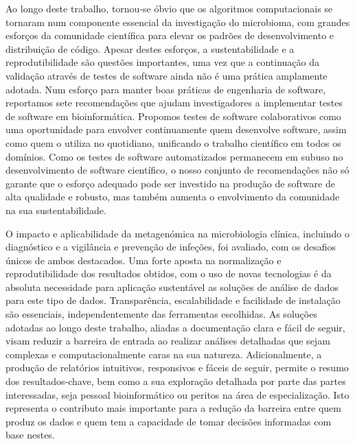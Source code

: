 Ao longo deste trabalho, tornou-se óbvio que os algoritmos computacionais se tornaram num componente essencial da investigação do microbioma, com grandes esforços da comunidade científica para elevar os padrões de desenvolvimento e distribuição de código. Apesar destes esforços, a sustentabilidade e a reprodutibilidade são questões importantes, uma vez que a continuação da validação através de testes de software ainda não é uma prática amplamente adotada. Num esforço para manter boas práticas de engenharia de software, reportamos sete recomendações que ajudam investigadores a implementar testes de software em bioinformática. Propomos testes de software colaborativos como uma oportunidade para envolver continuamente quem desenvolve software, assim como quem o utiliza no quotidiano, unificando o trabalho científico em todos os domínios. Como os testes de software automatizados permanecem em subuso no desenvolvimento de software científico, o nosso conjunto de recomendações não só garante que o esforço adequado pode ser investido na produção de software de alta qualidade e robusto, mas também aumenta o envolvimento da comunidade na sua sustentabilidade. 

O impacto e aplicabilidade da metagenómica na microbiologia clínica, incluindo o diagnóstico e a vigilância e prevenção de infeções, foi avaliado, com os desafios únicos de ambos destacados. Uma forte aposta na normalização e reprodutibilidade dos resultados obtidos, com o uso de novas tecnologias é da absoluta necessidade para aplicação sustentável as soluções de análise de dados para este tipo de dados. Transparência, escalabilidade e facilidade de instalação são essenciais, independentemente das ferramentas escolhidas. As soluções adotadas ao longo deste trabalho, aliadas a documentação clara e fácil de seguir, visam reduzir a barreira de entrada ao realizar análises detalhadas que sejam complexas e computacionalmente caras na sua natureza. Adicionalmente, a produção de relatórios intuitivos, responsivos e fáceis de seguir, permite o resumo dos resultados-chave, bem como a sua exploração detalhada por parte das partes interessadas, seja pessoal bioinformático ou peritos na área de especialização. Isto representa o contributo mais importante para a redução da barreira entre quem produz os dados e quem tem a capacidade de tomar decisões informadas com base nestes. 